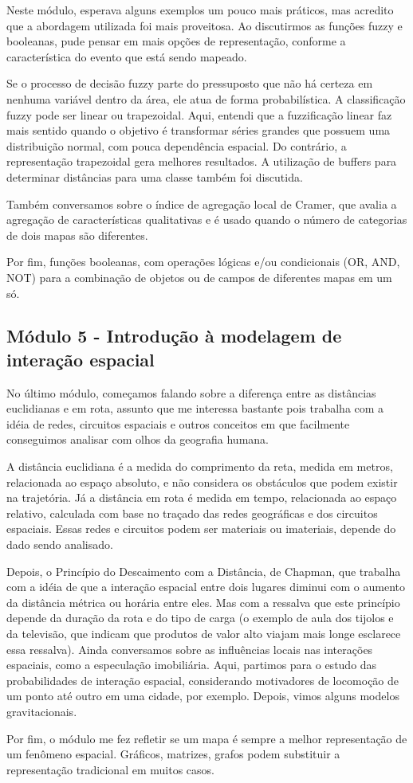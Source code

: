 Neste módulo, esperava alguns exemplos um pouco mais práticos, mas acredito que a abordagem utilizada foi mais proveitosa. Ao discutirmos as funções fuzzy e booleanas, pude pensar em mais opções de representação, conforme a característica do evento que está sendo mapeado.

Se o processo de decisão fuzzy parte do pressuposto que não há certeza em nenhuma variável dentro da área, ele atua de forma probabilística. A classificação fuzzy pode ser linear ou trapezoidal. Aqui, entendi que a fuzzificação linear faz mais sentido quando o objetivo é transformar séries grandes que possuem uma distribuição normal, com pouca dependência espacial. Do contrário, a representação trapezoidal gera melhores resultados. A utilização de buffers para determinar distâncias para uma classe também foi discutida.

Também conversamos sobre o índice de agregação local de Cramer, que avalia a agregação de características qualitativas e é usado quando o número de categorias de dois mapas são diferentes.

Por fim, funções booleanas, com operações lógicas e/ou condicionais (OR, AND, NOT) para a combinação de objetos ou de campos de diferentes mapas em um só.

\subsection{Módulo 5 - Introdução à modelagem de interação espacial}

No último módulo, começamos falando sobre a diferença entre as distâncias euclidianas e em rota, assunto que me interessa bastante pois trabalha com a idéia de redes, circuitos espaciais e outros conceitos em que facilmente conseguimos analisar com olhos da geografia humana.

A distância euclidiana é a medida do comprimento da reta, medida em metros, relacionada ao espaço absoluto, e não considera os obstáculos que podem existir na trajetória. Já a distância em rota é medida em tempo, relacionada ao espaço relativo, calculada com base no traçado das redes geográficas e dos circuitos espaciais. Essas redes e circuitos podem ser materiais ou imateriais, depende do dado sendo analisado.

Depois, o Princípio do Descaimento com a Distância, de Chapman, que trabalha com a idéia de que a interação espacial entre dois lugares diminui com o aumento da distância métrica ou horária entre eles. Mas com a ressalva que este princípio depende da duração da rota e do tipo de carga (o exemplo de aula dos tijolos e da televisão, que indicam que produtos de valor alto viajam mais longe esclarece essa ressalva). Ainda conversamos sobre as influências locais nas interações espaciais, como a especulação imobiliária. Aqui, partimos para o estudo das probabilidades de interação espacial, considerando motivadores de locomoção de um ponto até outro em uma cidade, por exemplo. Depois, vimos alguns modelos gravitacionais.

Por fim, o módulo me fez refletir se um mapa é sempre a melhor representação de um fenômeno espacial. Gráficos, matrizes, grafos podem substituir a representação tradicional em muitos casos.



